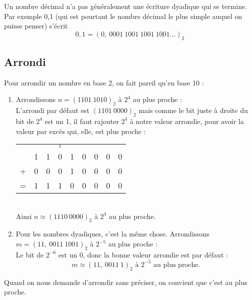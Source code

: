 \documentclass[a4paper,12pt,french]{book}
\begin{document}
\begin{remarque}[]
Un nombre décimal n'a pas généralement une écriture dyadique \og qui se termine\fg{}.\\
Par exemple 0,1 (qui est pourtant le nombre décimal le plus simple auquel on puisse penser) s'écrit
$$0,1 = (0,\ 0001\ 1001\ 1001\ \underline{1001} ...)_2$$
\end{remarque}

\subsection{Arrondi}

Pour arrondir un nombre en base 2, on fait pareil qu'en base 10 :

\begin{exemple}[s]

\begin{enumerate}[\bfseries a.]
	\item 	Arrondissons $n=(1101\ 1010)_2$ à $2^4$ au plus proche :\\
			L'arrondi par défaut est $(1101\ 0000)_2$ mais comme le bit juste à droite du bit de $2^4$ est un 1, il faut rajouter $2^4$ à
			notre valeur arrondie, pour avoir la valeur par excès qui, elle, est plus proche :
			\begin{center}
			\begin{tabular}{ccccccccc}
 			 &   &   & $_1$ &  &  &  &  &  \\
			 & 1 & 1 & 0 & 1 & 0 & 0 & 0 & 0 \\
			+ & 0 & 0 & 0 & 1 & 0 & 0 & 0 & 0 \\
			\hline
			 =& 1 & 1 &  1& 0 & 0 & 0 & 0 & 0 \\
			\end{tabular} \\[2em]

			Ainsi $n\approx (1110\ 0000)_2$ à $2^4$ au plus proche.
			\end{center}
	\item 	Pour les nombres dyadiques, c'est la même chose. Arrondissons $m=(11,\ 0011\ 1001)_2$ à $2^{-5}$ au plus proche :\\
			Le bit de $2^{-6}$ est un 0, donc la bonne valeur arrondie est par défaut :
				$$m\approx(11,\ 0011\ 1)_2\textrm{ à }2^{-5}\textrm{ au plus proche.}$$
\end{enumerate}
\end{exemple}

\begin{remarque}
Quand on nous demande d'arrondir sans préciser, on convient que c'est au plus proche.
\end{remarque}
\end{document}
